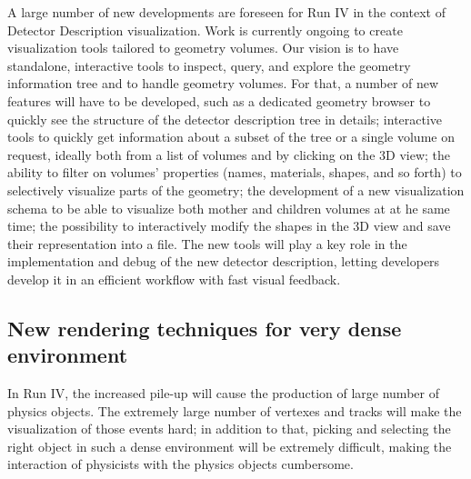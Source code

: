A large number of new developments are foreseen for Run IV in the context of Detector Description visualization. Work is currently ongoing to create visualization tools tailored to geometry volumes. Our vision is to have standalone, interactive tools to inspect, query, and explore the geometry information tree and to handle geometry volumes. For that, a number of new features will have to be developed, such as a dedicated geometry browser to quickly see the structure of the detector description tree in details; interactive tools to quickly get information about a subset of the tree or a single volume on request, ideally both from a list of volumes and by clicking on the 3D view; the ability to filter on volumes' properties (names, materials, shapes, and so forth) to selectively visualize parts of the geometry; the development of a new visualization schema to be able to visualize both mother and children volumes at at he same time; the possibility to interactively modify the shapes in the 3D view and save their representation into a file. %
The new tools will play a key role in the implementation and debug of the new detector description, letting developers develop it in an efficient workflow with fast visual feedback.





\subsection{New rendering techniques for very dense environment}

    

In Run IV, the increased pile-up will cause the production of large number of physics objects. The extremely large number of vertexes and tracks will make the visualization of those events hard; in addition to that, picking and selecting the right object in such a dense environment will be extremely difficult, making the interaction of physicists with the physics objects cumbersome. 

